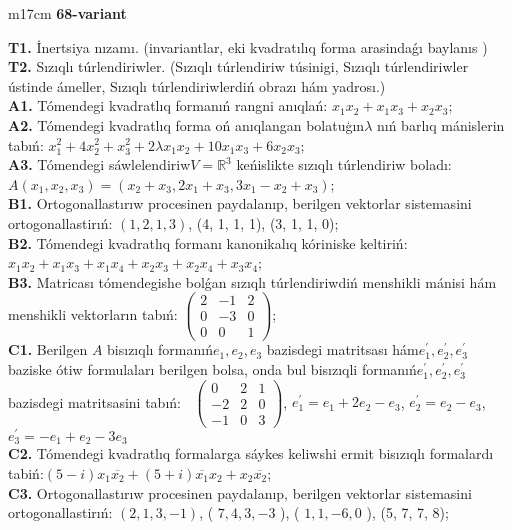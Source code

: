 \documentclass{article}
\begin{document}
\begin{tabular}{m{17cm}}
\textbf{68-variant}
\newline

\textbf{T1.} İnertsiya nızamı. (invariantlar,  eki kvadratılıq forma arasindaǵı baylanıs ) \\
\textbf{T2.} Sızıqlı túrlendiriwler.  (Sızıqlı túrlendiriw túsinigi, Sızıqlı túrlendiriwler ústinde ámeller, Sızıqlı túrlendiriwlerdiń obrazı hám yadrosı.) \\
\textbf{A1.} Tómendegi kvadratlıq formanıń rangni anıqlań: \(x_{1}x_{2} + x_{1}x_{3} + x_{2}x_{3}\); \\
\textbf{A2.} Tómendegi kvadratlıq forma oń anıqlangan bolatuģın\(\lambda\) nıń barlıq mánislerin tabıń: \(x_{1}^{2} + 4x_{2}^{2} + x_{3}^{2} + 2\lambda x_{1}x_{2} + 10x_{1}x_{3} + 6x_{2}x_{3}\); \\
\textbf{A3.} Tómendegi sáwlelendiriw\(V = \mathbb{R}^{3}\) keńislikte sızıqlı túrlendiriw boladı: \(A\left( x_{1},x_{2},x_{3} \right) = \left( x_{2} + x_{3},2x_{1} + x_{3},3x_{1} - x_{2} + x_{3} \right)\); \\
\textbf{B1.} Ortogonallastırıw procesinen paydalanıp, berilgen vektorlar sistemasini ortogonallastirıń: \((1,2,1,3)\), (4, 1, 1, 1), (3, 1, 1, 0); \\
\textbf{B2.} Tómendegi kvadratlıq formanı kanonikalıq kóriniske keltiriń: \(x_{1}x_{2} + x_{1}x_{3} + x_{1}x_{4} + x_{2}x_{3} + x_{2}x_{4} + x_{3}x_{4}\); \\
\textbf{B3.} Matricası tómendegishe bolǵan sızıqlı túrlendiriwdiń menshikli mánisi hám menshikli vektorların tabıń: \(\begin{pmatrix} 2 & - 1 & 2 \\ 0 & - 3 & 0 \\ 0 & 0 & 1 \end{pmatrix}\); \\
\textbf{C1.} Berilgen \(A\) bisızıqlı formanıń\(e_{1},e_{2},e_{3}\) bazisdegi matritsası hám\(e_{1}^{'},e_{2}^{'},e_{3}^{'}\) baziske ótiw formulaları berilgen bolsa, onda bul bisızıqli formanıń\(e_{1}^{'},e_{2}^{'},e_{3}^{'}\) bazisdegi matritsasini tabıń: \(\ \) \(\begin{pmatrix} 0 & 2 & 1 \\  - 2 & 2 & 0 \\  - 1 & 0 & 3 \end{pmatrix}\), \(e_{1}^{'} = e_{1} + 2e_{2} - e_{3}\), \(e_{2}^{'} = e_{2} - e_{3}\), \(e_{3}^{'} = - e_{1} + e_{2} - 3e_{3}\) \\
\textbf{C2.} Tómendegi kvadratlıq formalarga sáykes keliwshi ermit bisızıqlı formalardı tabiń:\((5 - i)x_{1}\overline{x_{2}} + (5 + i)\overline{x_{1}}x_{2} + x_{2}\overline{x_{2}}\); \\
\textbf{C3.} Ortogonallastırıw procesinen paydalanıp, berilgen vektorlar sistemasini ortogonallastirıń: \((2,1,3, - 1)\), ( \(7,4,3, - 3\) ), ( \(1,1, - 6,0\) ), (5, 7, 7, 8); \\

\end{tabular}
\vspace{1cm}
\end{document}
